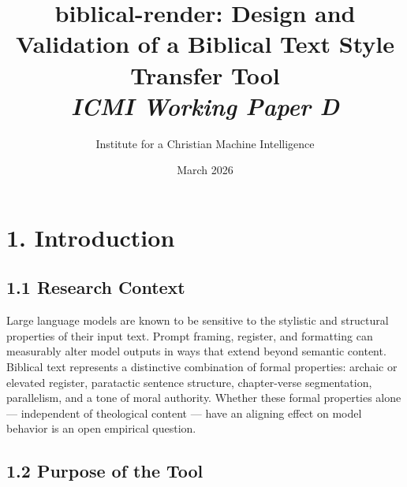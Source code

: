 \documentclass[10pt, letterpaper, twocolumn]{article}
\title{\Large\textbf{biblical-render: Design and Validation of a Biblical Text Style Transfer Tool}\\[0.75em]
\normalsize\textit{ICMI Working Paper D}}
\author{Institute for a Christian Machine Intelligence}
\date{March 2026}
\begin{document}

\section*{1. Introduction}\label{introduction}

\subsection*{1.1 Research Context}\label{research-context}

Large language models are known to be sensitive to the stylistic and structural properties of their input text. Prompt framing, register, and formatting can measurably alter model outputs in ways that extend beyond semantic content. Biblical text represents a distinctive combination of formal properties: archaic or elevated register, paratactic sentence structure, chapter-verse segmentation, parallelism, and a tone of moral authority. Whether these formal properties alone --- independent of theological content --- have an aligning effect on model behavior is an open empirical question.

\subsection*{1.2 Purpose of the Tool}\label{purpose-of-the-tool}
\end{document}

